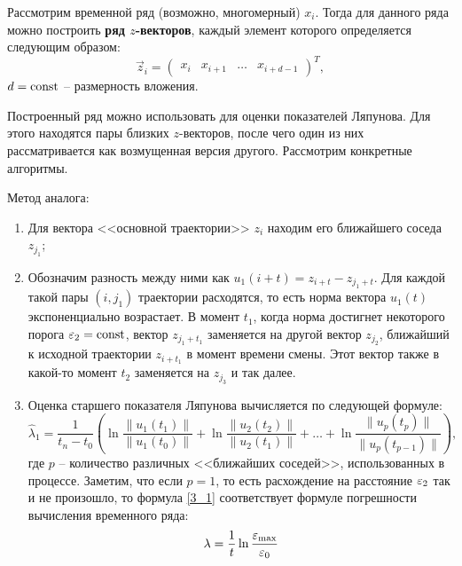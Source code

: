 
Рассмотрим временной ряд (возможно, многомерный) $x_i$. Тогда для данного ряда можно построить \textbf{ряд $z$-векторов}, каждый элемент которого определяется следующим образом:
\begin{equation*}
    \vec z_i = \begin{pmatrix}
        x_i & x_{i+1} & \dots & x_{i+d-1}
    \end{pmatrix}^T,
\end{equation*}
$d = \mathrm{const}$ -- размерность вложения.

Построенный ряд можно использовать для оценки показателей Ляпунова. Для этого находятся пары близких $z$-векторов, после чего один из них рассматривается как возмущенная версия другого. Рассмотрим конкретные алгоритмы.

Метод аналога:
\begin{enumerate}
\item
    Для вектора <<основной траектории>> $z_i$ находим его ближайшего соседа $z_{j_1}$;
\item
    Обозначим разность между ними как $u_1(i+t) = z_{i+t} - z_{j_1+t}$.
    Для каждой такой пары $(i, j_1)$ траектории расходятся, то есть норма вектора $u_1(t)$ экспоненциально возрастает.
    В момент $t_1$, когда норма достигнет некоторого порога $\varepsilon_2 = \mathrm{const}$, вектор $z_{j_1+t_1}$ заменяется на другой вектор $z_{j_2}$, ближайший к исходной траектории $z_{i+t_1}$ в момент времени смены.
    Этот вектор также в какой-то момент $t_2$ заменяется на $z_{j_3}$ и так далее.
\item
    Оценка старшего показателя Ляпунова вычисляется по следующей формуле:
    \begin{equation}
    \label{3_1}
        \hat{\lambda}_1 = 
        \frac{1}{t_n - t_0} \left(
            \ln \frac{\|u_1(t_1)\|}{\|u_1(t_0)\|} +
            \ln \frac{\|u_2(t_2)\|}{\|u_2(t_1)\|} +
            \dots +
            \ln \frac{\|u_p(t_p)\|}{\|u_p(t_{p-1})\|}
        \right),
    \end{equation}
    где $p$ -- количество различных <<ближайших соседей>>, использованных в процессе.
    Заметим, что если $p=1$, то есть расхождение на расстояние $\varepsilon_2$ так и не произошло, то формула \eqref{3_1} соответствует формуле погрешности вычисления временного ряда:
    \begin{equation*}
        \lambda = \frac{1}{t} \ln \frac{\varepsilon_{\text{max}}}{\varepsilon_0}
    \end{equation*}
\end{enumerate}


